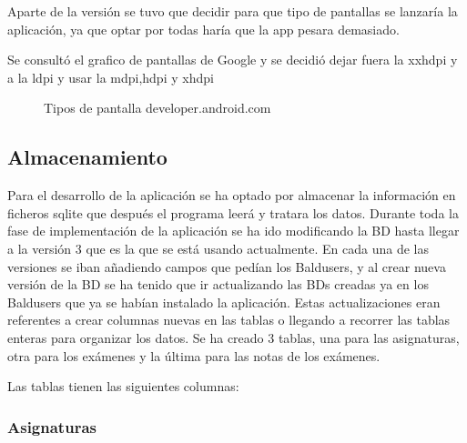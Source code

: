 Aparte de la versión se tuvo que decidir para que tipo de pantallas se lanzaría la aplicación, ya que optar por todas haría que la app pesara demasiado.

Se consultó el grafico de pantallas de Google y se decidió dejar fuera la xxhdpi y a la ldpi y usar la mdpi,hdpi y xhdpi

\begin{figure}[H] 
  \begin{center} 
    \caption{Tipos de pantalla developer.android.com} 
    \label{fig:TiposPantalla} 
  \end{center} 
\end{figure}

\subsection{Almacenamiento}
\label{subsecc:Almacenamiento}

Para el desarrollo de la aplicación se ha optado por almacenar la información en ficheros sqlite que después el programa leerá y tratara los datos. 
Durante toda la fase de implementación de la aplicación se ha ido modificando la BD hasta llegar a la versión 3 que es la que se está usando actualmente.
En cada una de las versiones se iban añadiendo campos que pedían los Baldusers, y al crear nueva versión de la BD se ha tenido que ir actualizando las BDs creadas ya en los Baldusers que ya se habían instalado la aplicación.
Estas actualizaciones eran referentes a crear columnas nuevas en las tablas o llegando a recorrer las tablas enteras para organizar los datos.
Se ha creado 3 tablas, una para las asignaturas, otra para los exámenes y la última para las notas de los exámenes.

Las tablas tienen las siguientes columnas:
\subsubsection{Asignaturas}
\label{subsubsecc:Asignaturas}


